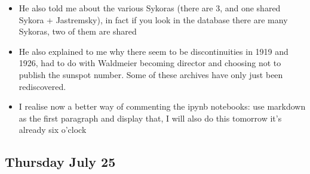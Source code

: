 \documentclass[12pt]{article}
\begin{document}
\begin{itemize}
    \item He also told me about the various Sykoras (there are 3, and one shared Sykora + Jastremsky), in fact if you look in the database there are many Sykoras, two of them are shared 
    \item He also explained to me why there seem to be discontinuities in 1919 and 1926, had to do with Waldmeier becoming director and choosing not to publish the sunspot number. Some of these archives have only just been rediscovered.
    \item I realise now a better way of commenting the ipynb notebooks: use markdown as the first paragraph and display that, I will also do this tomorrow it's already six o'clock
\end{itemize}

\subsection{Thursday July 25}
\end{document}
